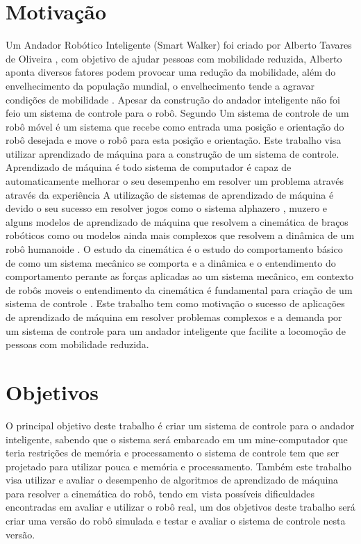 \label{Cap:Introducao}

\section{Motivação}

Um Andador Robótico Inteligente (Smart Walker) foi criado por Alberto Tavares de Oliveira ,
com objetivo de ajudar pessoas com mobilidade reduzida, Alberto aponta
diversos fatores podem provocar uma redução da mobilidade, além do 
envelhecimento da população mundial, o envelhecimento tende a agravar
condições de mobilidade \cite{oliveira2022projeto}. Apesar da construção
do andador inteligente não foi feio um sistema de controle para o robô.
Segundo \cite{siegwart2011introduction} Um sistema de controle de um
robô móvel  é um sistema que recebe como entrada uma posição
e orientação do robô desejada e move o robô para esta posição e orientação.
Este trabalho visa utilizar aprendizado de máquina para a construção de um
sistema de controle. Aprendizado de máquina é todo
sistema de computador é capaz de automaticamente melhorar o seu desempenho
em resolver um problema através através da experiência \cite{mitchell1990machine}
A utilização de sistemas de aprendizado de máquina é devido o seu sucesso em
resolver jogos como o sistema alphazero \cite{silver2017mastering}, muzero
\cite{schrittwieser2020mastering} e alguns modelos de aprendizado de máquina
que resolvem a cinemática de braços robóticos como \cite{cavalcanti2017self}
ou modelos ainda mais complexos que resolvem a dinâmica de um robô humanoide
\cite{phaniteja2017deep}. O estudo da cinemática é o estudo do comportamento
básico de como um sistema mecânico se comporta e a dinâmica e o entendimento
do comportamento perante as forças aplicadas ao um sistema mecânico, em contexto
de robôs moveis o entendimento da cinemática é fundamental para criação de um
sistema de controle \cite{siegwart2011introduction}. Este trabalho tem como
motivação o sucesso de aplicações de aprendizado de máquina em resolver problemas complexos e a
demanda por um sistema de controle para um andador inteligente que facilite a
locomoção de pessoas com mobilidade reduzida. 

\section{Objetivos}

O principal objetivo deste trabalho é criar um  sistema de
controle para o andador inteligente, sabendo que o sistema será
embarcado em um mine-computador que teria restrições de memória e
processamento o sistema de controle tem que ser projetado para utilizar
pouca e memória e processamento.
Também este trabalho visa utilizar e avaliar o desempenho de algoritmos
de aprendizado de máquina para resolver a cinemática do robô, tendo em
vista possíveis dificuldades encontradas em avaliar e utilizar o robô real,
um dos objetivos deste trabalho será criar uma versão do robô simulada e
testar e avaliar o sistema de controle nesta versão.

